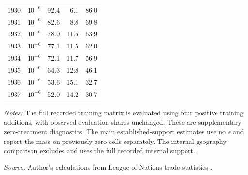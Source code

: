 \begin{table}[!htbp]
\begin{threeparttable}
\begin{tabular}{@{}llrrr@{}}
1930 & $10^{-6}$ & 92.4 & 6.1 & 86.0 \\
1931 & $10^{-6}$ & 82.6 & 8.8 & 69.8 \\
1932 & $10^{-6}$ & 78.0 & 11.5 & 63.9 \\
1933 & $10^{-6}$ & 77.1 & 11.5 & 62.0 \\
1934 & $10^{-6}$ & 72.1 & 11.7 & 56.9 \\
1935 & $10^{-6}$ & 64.3 & 12.8 & 46.1 \\
1936 & $10^{-6}$ & 53.6 & 15.1 & 32.7 \\
1937 & $10^{-6}$ & 52.0 & 14.2 & 30.7 \\
\bottomrule
\end{tabular}
\begin{tablenotes}[flushleft]\footnotesize\item \textit{Notes:} The full recorded training matrix is evaluated using four positive training additions, with observed evaluation shares unchanged. These are supplementary zero-treatment diagnostics. The main established-support estimates use no $\epsilon$ and report the mass on previously zero cells separately. The internal geography comparison excludes \External{} and uses the full recorded internal support.
\item \textit{Source:} Author's calculations from League of Nations trade statistics \parencite{league1930,league1936,league1938}.
\end{tablenotes}\end{threeparttable}\end{table}
